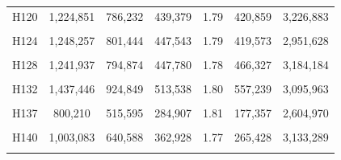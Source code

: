 \documentclass[
  a4paper,
  titlepage]{article}
\begin{document}
\begin{longtable}[t]{ccccccc}
H120 & 1,224,851 & 786,232 & 439,379 & 1.79 & 420,859 & 3,226,883\\
 
\cellcolor{gray!6}{H121} & \cellcolor{gray!6}{1,219,200} & \cellcolor{gray!6}{777,920} & \cellcolor{gray!6}{441,926} & \cellcolor{gray!6}{1.76} & \cellcolor{gray!6}{353,646} & \cellcolor{gray!6}{3,009,246}\\
 
H124 & 1,248,257 & 801,444 & 447,543 & 1.79 & 419,573 & 2,951,628\\
 
\cellcolor{gray!6}{H127} & \cellcolor{gray!6}{1,185,708} & \cellcolor{gray!6}{761,343} & \cellcolor{gray!6}{425,003} & \cellcolor{gray!6}{1.79} & \cellcolor{gray!6}{391,436} & \cellcolor{gray!6}{3,141,121}\\
 
H128 & 1,241,937 & 794,874 & 447,780 & 1.78 & 466,327 & 3,184,184\\
 
\cellcolor{gray!6}{H129} & \cellcolor{gray!6}{957,898} & \cellcolor{gray!6}{616,699} & \cellcolor{gray!6}{341,634} & \cellcolor{gray!6}{1.81} & \cellcolor{gray!6}{279,240} & \cellcolor{gray!6}{2,833,161}\\
 
H132 & 1,437,446 & 924,849 & 513,538 & 1.80 & 557,239 & 3,095,963\\
 
\cellcolor{gray!6}{H135} & \cellcolor{gray!6}{1,045,106} & \cellcolor{gray!6}{668,389} & \cellcolor{gray!6}{377,190} & \cellcolor{gray!6}{1.77} & \cellcolor{gray!6}{302,418} & \cellcolor{gray!6}{3,079,892}\\
 
H137 & 800,210 & 515,595 & 284,907 & 1.81 & 177,357 & 2,604,970\\
 
\cellcolor{gray!6}{H138} & \cellcolor{gray!6}{1,170,150} & \cellcolor{gray!6}{746,082} & \cellcolor{gray!6}{424,690} & \cellcolor{gray!6}{1.76} & \cellcolor{gray!6}{349,740} & \cellcolor{gray!6}{3,155,380}\\
 
H140 & 1,003,083 & 640,588 & 362,928 & 1.77 & 265,428 & 3,133,289\\
 
\cellcolor{gray!6}{H142} & \cellcolor{gray!6}{946,771} & \cellcolor{gray!6}{609,850} & \cellcolor{gray!6}{337,348} & \cellcolor{gray!6}{1.81} & \cellcolor{gray!6}{283,838} & \cellcolor{gray!6}{2,703,634}\\
 

\end{longtable}
\end{document}
